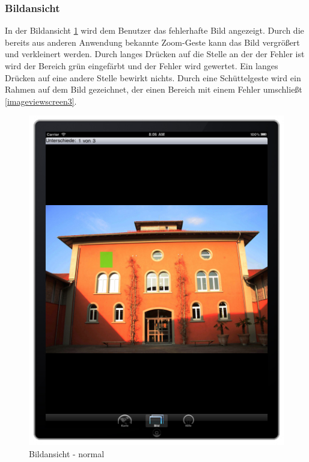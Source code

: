 \subsubsection{Bildansicht}
In der Bildansicht \ref{imageviewscreen1} wird dem Benutzer das fehlerhafte Bild
angezeigt. Durch die bereits aus anderen Anwendung bekannte Zoom-Geste kann das Bild vergrößert und
verkleinert werden. Durch langes Drücken auf die Stelle an der der Fehler ist
wird der Bereich grün eingefärbt und der Fehler wird gewertet. Ein langes
Drücken auf eine andere Stelle bewirkt nichts. Durch eine Schüttelgeste wird
ein Rahmen auf dem Bild gezeichnet, der einen Bereich mit einem Fehler
umschließt \ref{imageviewscreen3}.


 \begin{figure}[H]
  \centering
  \includegraphics[width=1.0\textwidth]{bilder/screen2.jpg}
  \caption{Bildansicht - normal}
  \label{imageviewscreen1}
\end{figure}
